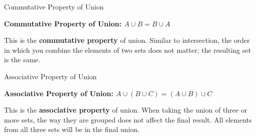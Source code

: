 \documentclass[11pt,aspectratio=1610]{beamer}
\begin{document}
\begin{frame}{Commutative Property of Union}
	\begin{center}
		\textbf{Commutative Property of Union: $A \cup B = B \cup A$}
	\end{center}
	\vspace{0.2cm}
	This is the \textbf{commutative property} of union. Similar to intersection, the order in which you combine the elements of two sets does not matter; the resulting set is the same.
	
	\begin{center}
		\quad
	\end{center}
\end{frame}

\begin{frame}{Associative Property of Union}
	\begin{center}
		\textbf{Associative Property of Union: $A \cup (B \cup C) = (A \cup B) \cup C$}
	\end{center}
	\vspace{0.2cm}
	This is the \textbf{associative property} of union. When taking the union of three or more sets, the way they are grouped does not affect the final result. All elements from all three sets will be in the final union.
	
	\begin{center}
	\end{center}
\end{frame}
\end{document}
